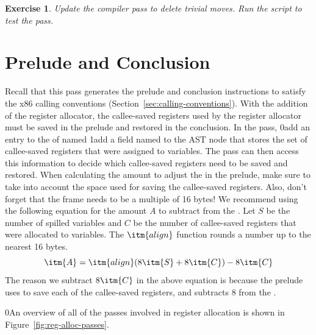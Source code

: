 \documentclass[7x10,nocrop]{TimesAPriori_MIT}%
\def\racketEd{0}
\def\pythonEd{1}
\def\edition{0}
\newcommand{\racket}[1]{{\if\edition\racketEd{#1}\fi}}
\newcommand{\python}[1]{{\if\edition\pythonEd #1\fi}}
\newtheorem{exercise}[theorem]{Exercise}
\begin{document}
\begin{exercise}\normalfont\normalsize
%
Update the  compiler pass to delete trivial moves.
%
%
Run the script to test the  pass.
\end{exercise}


\section{Prelude and Conclusion}
\label{sec:print-x86-reg-alloc}

Recall that this pass generates the prelude and conclusion
instructions to satisfy the x86 calling conventions
(Section~\ref{sec:calling-conventions}). With the addition of the
register allocator, the callee-saved registers used by the register
allocator must be saved in the prelude and restored in the conclusion.
In the  pass,
%
\racket{add an entry to the 
  of  named }
%
\python{add a field named \code{used\_callee} to the \code{X86Program} AST node}
%
that stores the set of callee-saved registers that were assigned to
variables. The  pass can then access
this information to decide which callee-saved registers need to be
saved and restored.
%
When calculating the amount to adjust the  in the prelude,
make sure to take into account the space used for saving the
callee-saved registers. Also, don't forget that the frame needs to be
a multiple of 16 bytes! We recommend using the following equation for
the amount $A$ to subtract from the . Let $S$ be the number
of spilled variables and $C$ be the number of callee-saved registers
that were allocated to variables. The $\itm{align}$ function rounds a
number up to the nearest 16 bytes.
\[
   \itm{A} = \itm{align}(8\itm{S} + 8\itm{C}) - 8\itm{C}
\]
The reason we subtract $8\itm{C}$ in the above equation is because the
prelude uses  to save each of the callee-saved registers,
and  subtracts $8$ from the .

\racket{An overview of all of the passes involved in register
  allocation is shown in Figure~\ref{fig:reg-alloc-passes}.}
\end{document}
